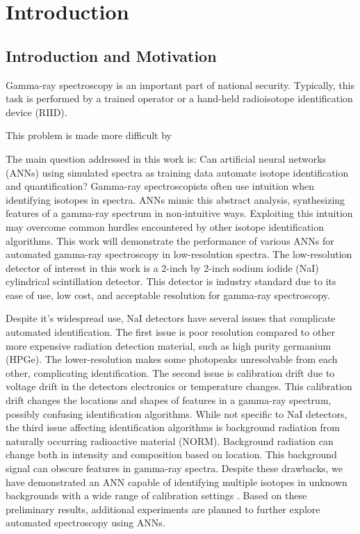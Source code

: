\chapter{Introduction}

\section{Introduction and Motivation}

Gamma-ray spectroscopy is an important part of national security. Typically, this task is performed by a trained operator or a hand-held radioisotope identification device (RIID). 

This problem is made more difficult by 

The main question addressed in this work is: Can artificial neural networks (ANNs) using simulated spectra as training data automate isotope identification and quantification? Gamma-ray spectroscopists often use intuition when identifying isotopes in spectra. ANNs mimic this abstract analysis, synthesizing features of a gamma-ray spectrum in non-intuitive ways. Exploiting this intuition may overcome common hurdles encountered by other isotope identification algorithms. This work will demonstrate the performance of various ANNs for automated gamma-ray spectroscopy in low-resolution spectra. The low-resolution detector of interest in this work is a 2-inch by 2-inch sodium iodide (NaI) cylindrical scintillation detector. This detector is industry standard due to its ease of use, low cost, and acceptable resolution for gamma-ray spectroscopy. 

Despite it's widespread use, NaI detectors have several issues that complicate automated identification. The first issue is poor resolution compared to other more expensive radiation detection material, such as high purity germanium (HPGe). The lower-resolution makes some photopeaks unresolvable from each other, complicating identification. The second issue is calibration drift due to voltage drift in the detectors electronics or temperature changes. This calibration drift changes the locations and shapes of features in a gamma-ray spectrum, possibly confusing identification algorithms. While not specific to NaI detectors, the third issue affecting identification algorithms is background radiation from naturally occurring radioactive material (NORM). Background radiation can change both in intensity and composition based on location. This background signal can obscure features in gamma-ray spectra. Despite these drawbacks, we have demonstrated an ANN capable of identifying multiple isotopes in unknown backgrounds with a wide range of calibration settings \cite{kamudaThesis2017,kamuda2017}. Based on these preliminary results, additional experiments are planned to further explore automated spectroscopy using ANNs.

